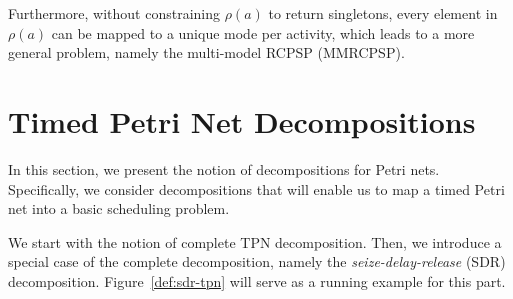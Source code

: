 \documentclass[11pt]{article}
\newcommand{\todo}[1]{\textcolor{red}{\bf {#1}}}
\begin{document}
Furthermore, without constraining $\rho(a)$ to return singletons, 
every element in $\rho(a)$ can be mapped to a unique 
mode per activity, which leads to a more general problem, namely
the multi-model RCPSP (MMRCPSP).



\section{Timed Petri Net Decompositions}

%

In this section, we present the notion of decompositions for Petri nets.
Specifically, we consider decompositions that will enable us to 
map a timed Petri net into a basic scheduling problem.

We start with the notion of complete TPN decomposition. 
Then, we introduce a special case of the complete decomposition, 
namely the \emph{seize-delay-release} (SDR) decomposition. Figure~\ref{def:sdr-tpn}
will serve as a running example for this part.
\end{document}
